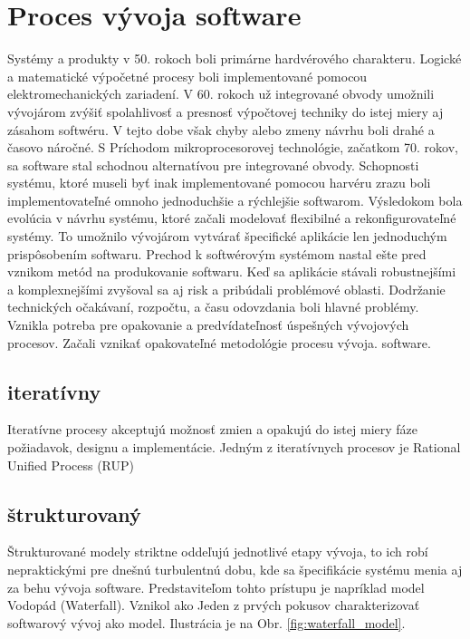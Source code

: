 \section{Proces vývoja software}
Systémy a produkty v 50. rokoch boli primárne hardvérového charakteru. Logické a matematické výpočetné procesy boli implementované pomocou elektromechanických zariadení. V 60. rokoch už integrované obvody umožnili vývojárom zvýšiť spolahlivosť a presnosť výpočtovej techniky do istej miery aj zásahom softwéru. V tejto dobe však chyby alebo zmeny návrhu boli drahé a časovo náročné.
S Príchodom mikroprocesorovej technológie, začatkom 70. rokov, sa software stal schodnou alternatívou pre integrované obvody. Schopnosti systému, ktoré museli byť inak implementované pomocou harvéru zrazu boli implementovateľné omnoho jednoduchšie a rýchlejšie softwarom. Výsledokom bola evolúcia v návrhu systému, ktoré začali modelovať flexibilné a rekonfigurovateľné systémy.\cite{wasson2006system} To umožnilo vývojárom vytvárať špecifické aplikácie len jednoduchým prispôsobením softwaru.
Prechod k softwérovým systémom nastal ešte pred vznikom metód na produkovanie softwaru. Keď sa aplikácie stávali robustnejšími a komplexnejšími zvyšoval sa aj risk a pribúdali problémové oblasti. Dodržanie technických očakávaní, rozpočtu, a času odovzdania boli hlavné problémy. Vznikla potreba pre opakovanie a predvídateľnosť úspešných vývojových procesov. Začali vznikať opakovateľné metodológie procesu vývoja. software.
\subsection{iteratívny}
Iteratívne procesy akceptujú možnosť zmien a opakujú do istej miery fáze požiadavok, designu a implementácie. Jedným z iteratívnych procesov je Rational Unified Process (RUP)
\subsection{štrukturovaný}
Štrukturované modely striktne oddeľujú jednotlivé etapy vývoja, to ich robí nepraktickými pre dnešnú turbulentnú dobu, kde sa špecifikácie systému menia aj za behu vývoja software. Predstaviteľom tohto prístupu je napríklad model Vodopád (Waterfall). Vznikol ako Jeden z prvých pokusov charakterizovať softwarový vývoj ako model. Ilustrácia je na Obr. \ref{fig:waterfall_model}.

